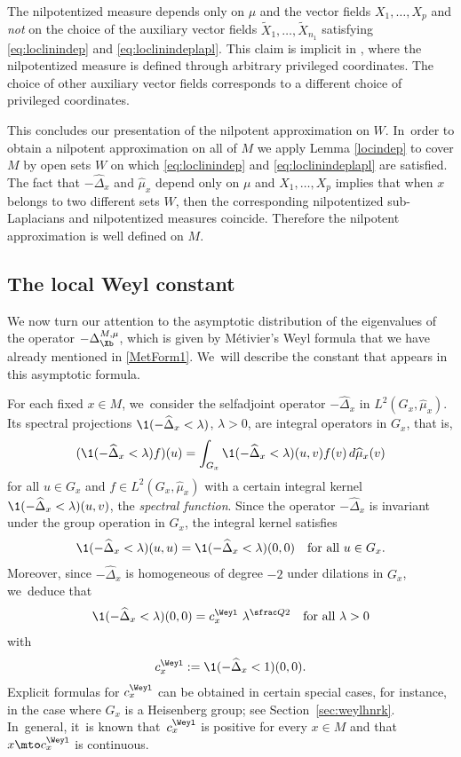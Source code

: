 The nilpotentized measure depends only on $\mu$ and the vector fields $X_1,\ldots, X_p$ and \emph{not} on the choice of the auxiliary vector fields $\tilde X_1,\ldots,\tilde X_{n_1}$ satisfying \eqref{eq:loclinindep} and \eqref{eq:loclinindeplapl}. This claim is implicit in \cite[\S A.5.6]{CHT1}, where the nilpotentized measure is defined through arbitrary privileged coordinates. The choice of other auxiliary vector fields corresponds to a different choice of privileged coordinates.

This concludes our presentation of the nilpotent approximation on $W$. In~order to obtain a nilpotent approximation on all of $M$ we apply Lemma \ref{locindep} to cover $M$ by open sets $W$ on which \eqref{eq:loclinindep} and \eqref{eq:loclinindeplapl} are satisfied. The fact that $-\widehat\Delta_x$ and $\widehat\mu_x$ depend only on $\mu$ and $X_1,\ldots,X_p$ implies that when $x$ belongs to two different sets $W$, then the corresponding nilpotentized sub-Laplacians and nilpotentized measures coincide. Therefore the nilpotent approximation is well defined on $M$.

\subsection{The local Weyl constant}
We now turn our attention to the asymptotic distribution of the eigenvalues of the operator $-\Delta_{\Xb}^{M,\mu}$, which is given by Métivier's Weyl formula \cite{Me} that we have already mentioned in \eqref{MetForm1}. We~will describe the constant that appears in this asymptotic formula.

For each fixed $x\in M$, we~consider the selfadjoint operator $-\widehat \Delta_x$ in $L^2(G_x,\widehat\mu_x)$. Its spectral projections $\1(-\widehat\Delta_x<\lambda)$, $\lambda>0$, are integral operators in $G_x$, that is,
\[
(\1(-\widehat\Delta_x<\lambda) f)(u) = \int_{G_x} \1(-\widehat\Delta_x<\lambda)(u,v) f(v)\,d\widehat\mu_x(v)
\]
for all $u\in G_x$ and $f\in L^2(G_x,\widehat\mu_x)$ with a certain integral kernel $\1(-\widehat\Delta_x<\lambda)(u,v)$, the \emph{spectral function}. Since the operator $-\widehat\Delta_x$ is invariant under the group operation in $G_x$, the integral kernel satisfies
\[
\1(-\widehat\Delta_x<\lambda)(u,u) = \1(-\widehat\Delta_x<\lambda)(0,0)
\quad\text{for all}\ u\in G_x.
\]
Moreover, since $-\widehat\Delta_x$ is homogeneous of degree $-2$ under dilations in $G_x$, we~deduce that
\begin{equation}
\label{eq:specfcndiag1}
\1(-\widehat\Delta_x<\lambda)(0,0) = c_x^\Weyl \ \lambda^{\sfrac Q2}
\quad\text{for all}\ \lambda>0
\end{equation}
with
\begin{equation}
\label{eq:specfcndiag2}
c_x^\Weyl := \1(-\widehat\Delta_x<1)(0,0).
\end{equation}
Explicit formulas for $c_x^\Weyl$ can be obtained in certain special cases, for instance, in the case where $G_x$ is a Heisenberg group; see Section~\ref{sec:weylhnrk}. In~general, it~is known that~$c^\Weyl_x$ is positive for every $x\in M$ and that $x\mto c^\Weyl_x$ is continuous.

